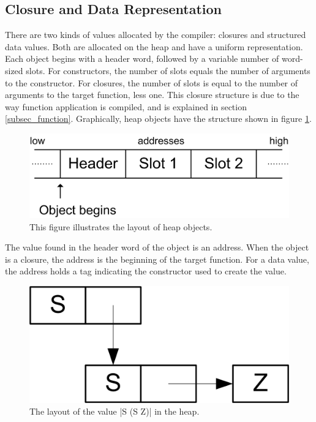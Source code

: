 \documentclass[11pt]{article}
\begin{document}
\subsection{Closure and Data Representation}
\label{subsec_closure}
There are two kinds of values allocated by the compiler: closures and
structured data values. Both are allocated on the heap and have a
uniform representation. Each object begins with a header word,
followed by a variable number of word-sized slots. For constructors,
the number of slots equals the number of arguments to the
constructor. For closures, the number of slots is equal to the number
of arguments to the target function, less one. This closure structure
is due to the way function application is compiled, and is explained in
section \ref{subsec_function}. Graphically, heap
objects have the structure shown in figure \ref{fig_Heap}.

\begin{figure}\centering
\includegraphics{fig_Heap}
\caption{This figure illustrates the layout of heap objects.}
\label{fig_Heap}
\end{figure}

The value found in the header word of the object is an address. When
the object is a closure, the address is the beginning of the target
function. For a data value, the address holds a tag indicating the
constructor used to create the value.

\begin{figure}\centering
\includegraphics{fig_HeapExample}
\caption{The layout of the value |S (S Z)| in the heap.}
\label{fig_HeapExample}
\end{figure}
\end{document}
